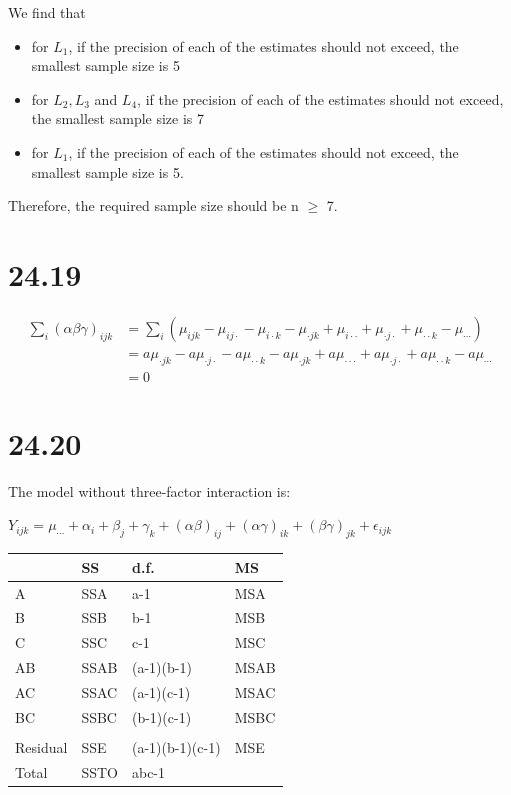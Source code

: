 \documentclass{article}\usepackage[]{graphicx}\usepackage[]{color}
\begin{document}
\quad We find that 
  \begin{itemize}
  \item
    for $L_1$, if the precision of each of the estimates should not exceed, the smallest sample size is 5 
  \item
    for $L_2, L_3$ and $L_4$, if the precision of each of the estimates should not exceed, the smallest sample size is 7 
  \item 
    for $L_1$, if the precision of each of the estimates should not exceed, the smallest sample size is 5.
  \end{itemize}
Therefore, the required sample size should be n $\geq$ 7.

\section{24.19}

\begin{displaymath}
\begin{split}
\sum_i(\alpha\beta\gamma)_{ijk} &= \sum_i(\mu_{ijk} - \mu_{ij\cdot} - \mu_{i\cdot k} - \mu_{\cdot jk} + \mu_{i\cdot\cdot} + \mu_{\cdot j \cdot} + \mu_{\cdot \cdot k} - \mu_{\cdots}) \\
                                &= a\mu_{\cdot jk} - a\mu_{\cdot j\cdot} - a\mu_{\cdot\cdot k} - a\mu_{\cdot jk} + a\mu_{\cdot\cdot\cdot} + a\mu_{\cdot j \cdot} + a\mu_{\cdot \cdot k} - a\mu_{\cdots} \\
                                &= 0
\end{split}
\end{displaymath}

\section{24.20}

The model without three-factor interaction is:
\begin{center}
$Y_{ijk} = \mu_{\cdots} + \alpha_i + \beta_j + \gamma_k + (\alpha\beta)_{ij} + (\alpha\gamma)_{ik} + (\beta\gamma)_{jk} + \epsilon_{ijk}$
\end{center}

\begin{table}[h]
\begin{tabular}{llll}
         & SS   & d.f.            & MS   \\ \hline
A        & SSA  & a-1             & MSA  \\
B        & SSB  & b-1             & MSB  \\
C        & SSC  & c-1             & MSC  \\
AB       & SSAB & (a-1)(b-1)      & MSAB \\
AC       & SSAC & (a-1)(c-1)      & MSAC \\
BC       & SSBC & (b-1)(c-1)      & MSBC \\
         &      &                 &      \\ \hline
Residual & SSE  & (a-1)(b-1)(c-1) & MSE  \\
Total    & SSTO & abc-1           &     
\end{tabular}
\end{table}
\end{document}
